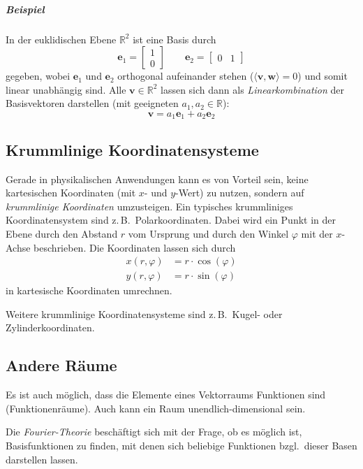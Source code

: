 \documentclass[a4paper, 11pt, accentcolor = tud3b]{tudreport}
\newcommand{\R}{\mathbb{R}}
\renewcommand{\vec}[1]{\boldsymbol{\mathbf{#1}}}
\newcommand{\bzgl}{bzgl.~}
\newcommand{\zB}{z.\,B.~}
\begin{document}
				\subparagraph{Beispiel}
					In der euklidischen Ebene \( \R^2 \) ist eine Basis durch
					\begin{equation*}
						\vec{e}_1 = \begin{bmatrix} 1 \\ 0 \end{bmatrix} \quad\quad \vec{e}_2 = \begin{bmatrix} 0 & 1 \end{bmatrix}
					\end{equation*}
					gegeben, wobei \(\vec{e}_1\) und \(\vec{e}_2\) orthogonal aufeinander stehen (\( \langle \vec{v}, \vec{w} \rangle = 0 \)) und somit linear unabhängig sind. Alle \( \vec{v} \in \R^2 \) lassen sich dann als \emph{Linearkombination} der Basisvektoren darstellen (mit geeigneten \( a_1, a_2 \in \R \)):
					\begin{equation*}
						\vec{v} = a_1 \vec{e}_1 + a_2 \vec{e}_2
					\end{equation*}

			\subsection{Krummlinige Koordinatensysteme}
				Gerade in physikalischen Anwendungen kann es von Vorteil sein, keine kartesischen Koordinaten (mit \(x\)- und \(y\)-Wert) zu nutzen, sondern auf \emph{krummlinige Koordinaten} umzusteigen. Ein typisches krummliniges Koordinatensystem sind \zB Polarkoordinaten. Dabei wird ein Punkt in der Ebene durch den Abstand \(r\) vom Ursprung und durch den Winkel \(\varphi\) mit der \(x\)-Achse beschrieben. Die Koordinaten lassen sich durch
				\begin{align*}
					x(r, \varphi) &= r \cdot \cos(\varphi) \\
					y(r, \varphi) &= r \cdot \sin(\varphi)
				\end{align*}
				in kartesische Koordinaten umrechnen.
				
				Weitere krummlinige Koordinatensysteme sind \zB Kugel- oder Zylinderkoordinaten.

			\subsection{Andere Räume}
				Es ist auch möglich, dass die Elemente eines Vektorraums Funktionen sind (Funktionenräume). Auch kann ein Raum unendlich-dimensional sein.
				
				Die \emph{Fourier-Theorie} beschäftigt sich mit der Frage, ob es möglich ist, Basisfunktionen zu finden, mit denen sich beliebige Funktionen \bzgl dieser Basen darstellen lassen.
\end{document}
